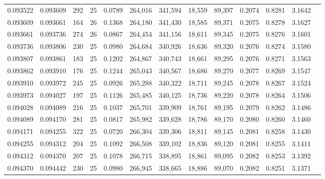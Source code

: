 \begin{tabular}{rrrrrrrrrrrrr}
0.093522 & 0.093609 &   292 &  25 &                                     0.0789 & 264,016 & 341,594 &  18,559 &  89,397 & 0.2074 & 0.8281 & 3.1642 \\
0.093609 & 0.093661 &   164 &  26 &                                     0.1368 & 264,180 & 341,430 &  18,585 &  89,371 & 0.2075 & 0.8278 & 3.1627 \\
0.093661 & 0.093736 &   274 &  26 &                                     0.0867 & 264,454 & 341,156 &  18,611 &  89,345 & 0.2075 & 0.8276 & 3.1601 \\
0.093736 & 0.093806 &   230 &  25 &                                     0.0980 & 264,684 & 340,926 &  18,636 &  89,320 & 0.2076 & 0.8274 & 3.1580 \\
0.093807 & 0.093861 &   183 &  25 &                                     0.1202 & 264,867 & 340,743 &  18,661 &  89,295 & 0.2076 & 0.8271 & 3.1563 \\
0.093862 & 0.093910 &   176 &  25 &                                     0.1244 & 265,043 & 340,567 &  18,686 &  89,270 & 0.2077 & 0.8269 & 3.1547 \\
0.093910 & 0.093972 &   245 &  25 &                                     0.0926 & 265,288 & 340,322 &  18,711 &  89,245 & 0.2078 & 0.8267 & 3.1524 \\
0.093973 & 0.094027 &   197 &  25 &                                     0.1126 & 265,485 & 340,125 &  18,736 &  89,220 & 0.2078 & 0.8264 & 3.1506 \\
0.094028 & 0.094089 &   216 &  25 &                                     0.1037 & 265,701 & 339,909 &  18,761 &  89,195 & 0.2079 & 0.8262 & 3.1486 \\
0.094089 & 0.094170 &   281 &  25 &                                     0.0817 & 265,982 & 339,628 &  18,786 &  89,170 & 0.2080 & 0.8260 & 3.1460 \\
0.094171 & 0.094255 &   322 &  25 &                                     0.0720 & 266,304 & 339,306 &  18,811 &  89,145 & 0.2081 & 0.8258 & 3.1430 \\
0.094255 & 0.094312 &   204 &  25 &                                     0.1092 & 266,508 & 339,102 &  18,836 &  89,120 & 0.2081 & 0.8255 & 3.1411 \\
0.094312 & 0.094370 &   207 &  25 &                                     0.1078 & 266,715 & 338,895 &  18,861 &  89,095 & 0.2082 & 0.8253 & 3.1392 \\
0.094370 & 0.094442 &   230 &  25 &                                     0.0980 & 266,945 & 338,665 &  18,886 &  89,070 & 0.2082 & 0.8251 & 3.1371 \\

\end{tabular}
